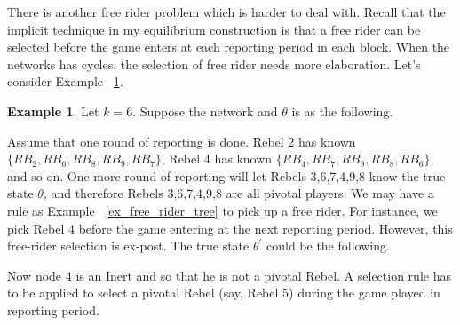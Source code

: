 \documentclass[12pt,letterpaper]{article}
\newtheorem*{main result}{Main Result}
\theoremstyle{definition}
\newtheorem{example}{Example}[section]
\theoremstyle{remark}
\theoremstyle{claim}
\begin{document}
There is another free rider problem which is harder to deal with. Recall that the implicit technique in my equilibrium construction is that a free rider can be selected before the game enters at each reporting period in each block. When the networks has cycles, the selection of free rider needs more elaboration. Let's consider Example ~\ref{ex_free_rider_cycle}.
\begin{example}\label{ex_free_rider_cycle}
Let $k=6$. Suppose the network and $\theta$ is as the following. 

\begin{center}
\end{center}

Assume that one round of reporting is done. Rebel 2 has known $\{RB_2,RB_6,RB_8,RB_9,RB_7\}$, Rebel 4 has known $\{RB_4,RB_7,RB_9,RB_8,RB_6\}$, and so on. One more round of reporting will let Rebels 3,6,7,4,9,8 know the true state $\theta$, and therefore Rebels 3,6,7,4,9,8 are all pivotal players. We may have a rule as Example ~\ref{ex_free_rider_tree} to pick up a free rider. For instance, we pick Rebel 4 before the game entering at the next reporting period. However, this free-rider selection is ex-post. The true state $\theta^{'}$ could be the following.

\begin{center}
\end{center}

Now node 4 is an Inert and so that he is not a pivotal Rebel. A selection rule has to be applied to select a pivotal Rebel (say, Rebel 5) during the game played in reporting period. 

\end{example}
\end{document}
